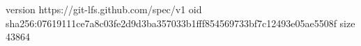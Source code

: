 version https://git-lfs.github.com/spec/v1
oid sha256:07619111ce7a8c03fe2d9d3ba357033b1fff854569733bf7c12493e05ae5508f
size 43864
